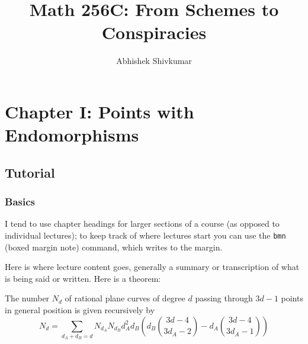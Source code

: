 \documentclass[justified, nofonts, notitlepage, openany, debug, nobib]{tufte-book}
\begin{document}
\title{Math 256C: From Schemes to Conspiracies}
\author{Abhishek Shivkumar}


\chapter{Chapter I: Points with Endomorphisms}
\section{Tutorial}
\subsection{Basics}

I tend to use chapter headings for larger sections of a course (as opposed to individual lectures); to keep track of where lectures start you can use the \texttt{bmn} (boxed margin note) command, which writes to the margin.

Here is where lecture content goes, generally a summary or transcription of what is being said or written. Here is a theorem:
\begin{theorem}[Kontsevich]
    The number $N_d$ of rational plane curves of degree $d$ passing through $3d-1$ points in general position is given recursively by $$N_d = \sum_{d_A + d_B = d} N_{d_A} N_{d_B} d_A^2 d_B\left(d_B\binom{3d-4}{3d_A -2} - d_A \binom{3d-4}{3d_A-1}\right)$$
\end{theorem}
\end{document}
